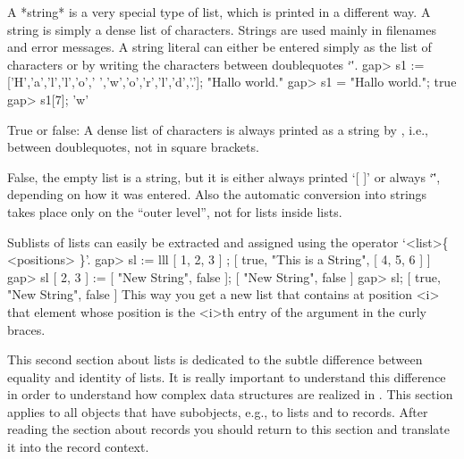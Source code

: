 A *string*
%
is a  very special type of list,  which is printed in  a different way. A
string is simply a  dense list of  characters. Strings are used mainly in
filenames  and error  messages. A string  literal can  either  be entered
simply as the  list of  characters  or by writing  the characters between
doublequotes `\"'.
\beginexample
    gap> s1 := ['H','a','l','l','o',' ','w','o','r','l','d','.'];
    "Hallo world."
    gap> s1 = "Hallo world.";
    true
    gap> s1[7];
    'w' 
\endexample

\exercise True or false: A dense list of  characters is always printed as
a string by {\GAP}, i.e., between doublequotes, not in square brackets.

\answer False, the  empty list  is a string,   but  it is either   always
printed `[ ]' or always `\"\"', depending on how it was entered. Also the
automatic conversion   into strings  takes   place  only on  the  ``outer
level'', not for lists inside lists.

Sublists of lists can easily be extracted and assigned using the operator
`<list>\{ <positions> \}'.
\beginexample
    gap> sl := lll{ [ 1, 2, 3 ] };
    [ true, "This is a String", [ 4, 5, 6 ] ]
    gap> sl{ [ 2, 3 ] } := [ "New String", false ];
    [ "New String", false ]
    gap> sl;
    [ true, "New String", false ] 
\endexample
This way you get  a new list that  contains at position <i> that  element
whose position is the <i>th entry of the argument in the curly braces.


This second  section  about lists is dedicated  to  the subtle difference
between  equality  and identity  of   lists. It  is  really  important to
understand   this  difference in  order   to  understand how complex data
structures are  realized in {\GAP}.   This section applies  to all {\GAP}
objects  that have  subobjects,  e.g.,  to lists   and to  records. After
reading the section  about records you  should return to this section and
translate it into the record context.

